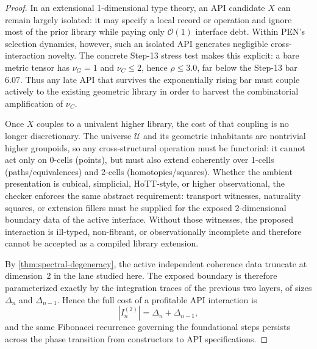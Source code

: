 \documentclass[11pt,a4paper]{article}
\theoremstyle{plain}
\theoremstyle{definition}
\theoremstyle{remark}
\newcommand{\U}{\mathcal{U}}
\begin{document}
\begin{proof}
In an extensional 1-dimensional type theory, an API candidate $X$ can remain largely isolated: it may specify a local record or operation and ignore most of the prior library while paying only $\mathcal{O}(1)$ interface debt.
Within PEN's selection dynamics, however, such an isolated API generates negligible cross-interaction novelty.
The concrete Step-13 stress test makes this explicit: a bare metric tensor has $\nu_G = 1$ and $\nu_C \le 2$, hence $\rho \le 3.0$, far below the Step-13 bar $6.07$.
Thus any late API that survives the exponentially rising bar must couple actively to the existing geometric library in order to harvest the combinatorial amplification of $\nu_C$.

Once $X$ couples to a univalent higher library, the cost of that coupling is no longer discretionary.
The universe $\U$ and its geometric inhabitants are nontrivial higher groupoids, so any cross-structural operation must be functorial: it cannot act only on 0-cells (points), but must also extend coherently over 1-cells (paths/equivalences) and 2-cells (homotopies/squares).
Whether the ambient presentation is cubical, simplicial, HoTT-style, or higher observational, the checker enforces the same abstract requirement: transport witnesses, naturality squares, or extension fillers must be supplied for the exposed 2-dimensional boundary data of the active interface.
Without those witnesses, the proposed interaction is ill-typed, non-fibrant, or observationally incomplete and therefore cannot be accepted as a compiled library extension.

By \cref{thm:spectral-degeneracy}, the active independent coherence data truncate at dimension~2 in the lane studied here.
The exposed boundary is therefore parameterized exactly by the integration traces of the previous two layers, of sizes $\Delta_n$ and $\Delta_{n-1}$.
Hence the full cost of a profitable API interaction is
\[
  |I_n^{(2)}| = \Delta_n + \Delta_{n-1},
\]
and the same Fibonacci recurrence governing the foundational steps persists across the phase transition from constructors to API specifications.
\end{proof}
\end{document}
